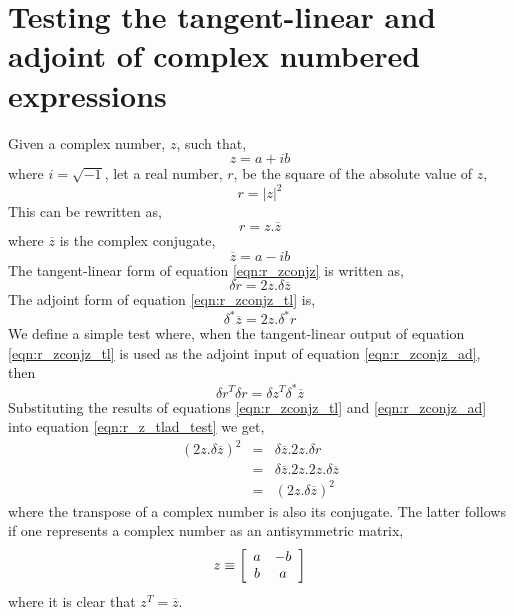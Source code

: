 \section{Testing the tangent-linear and adjoint of complex numbered expressions}

Given a complex number, $z$, such that,
\begin{equation}
  z = a + ib
  \label{eqn:z_defn}
\end{equation}
where $i = \sqrt{-1}$, let a real number, $r$, be the square of the absolute value of $z$,
\begin{equation}
  r = |z|^2
  \label{eqn:r_z}
\end{equation}
This can be rewritten as,
\begin{equation}
  r = z.\overline{z}
  \label{eqn:r_zconjz}
\end{equation}
where $\overline{z}$ is the complex conjugate,
\begin{equation}
  \overline{z} = a - ib
  \label{eqn:conjz_defn}
\end{equation}
The tangent-linear form of equation \ref{eqn:r_zconjz} is written as,
\begin{equation}
  \delta r = 2z.\delta\overline{z}
  \label{eqn:r_zconjz_tl}
\end{equation}
The adjoint form of equation \ref{eqn:r_zconjz_tl} is,
\begin{equation}
  \delta^{*}\overline{z} = 2z.\delta^{*}r
  \label{eqn:r_zconjz_ad}
\end{equation}
We define a simple test where, when the tangent-linear output of equation \ref{eqn:r_zconjz_tl} is used as the adjoint input of equation \ref{eqn:r_zconjz_ad}, then
\begin{equation}
  \delta r^{T}\delta r = \delta z^T \delta^{*}\overline{z} 
  \label{eqn:r_z_tlad_test}
\end{equation}
Substituting the results of equations \ref{eqn:r_zconjz_tl} and \ref{eqn:r_zconjz_ad} into equation \ref{eqn:r_z_tlad_test} we get,
\begin{eqnarray}
  \left(2z.\delta\overline{z}\right)^{2} & = & \delta\overline{z}.2z.\delta r\nonumber \\
                                         & = & \delta\overline{z}.2z.2z.\delta\overline{z}\nonumber \\
                                         & = & \left(2z.\delta\overline{z}\right)^{2}
  \label{eqn:r_z_tlad_test_subst}
\end{eqnarray}
where the transpose of a complex number is also its conjugate. The latter follows if one represents a complex number as an antisymmetric matrix,
\begin{equation}
  z \equiv \left[
             \begin{array}{c c}
               a & -b \\
               b & a
             \end{array}
           \right]
\end{equation}
where it is clear that $z^T = \overline{z}$.
